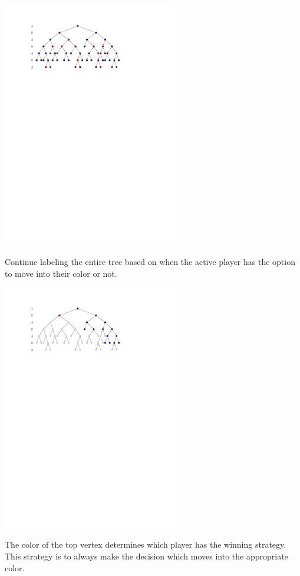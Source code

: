 \documentclass{beamer}
\theoremstyle{theorem}
\theoremstyle{definition}
\newcommand{\<}{\langle}
\renewcommand{\>}{\rangle}
\begin{document}
\begin{frame}
  \centerline{\includegraphics[width=3in]{decisionTree4.pdf}}

  \vspace{1em}

  Continue labeling the entire tree based on when the active player has
  the option to move into their color or not.
\end{frame}

\begin{frame}
  \centerline{\includegraphics[width=3in]{decisionTree5.pdf}}

  \vspace{1em}

  The color of the top vertex determines which player has the winning strategy.
  This strategy is to always make the decision which moves into the appropriate
  color.
\end{frame}
\end{document}
